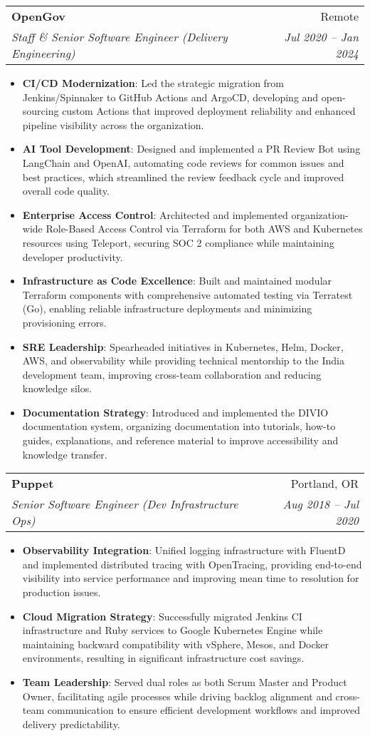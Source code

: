\documentclass[letterpaper,11pt]{article}
\makeatletter
\newcommand{\resumeItem}[2]{
\item[\textsc{}]\small{
    \textbf{#1}{: #2 \vspace{-2pt}}
  }
}
\newcommand{\resumeSubheading}[4]{
  \vspace{-1pt}\item
    \begin{tabular*}{0.97\textwidth}[t]{l@{\extracolsep{\fill}}r}
      \textbf{#1} & #2 \\
      \textit{\small#3} & \textit{\small #4} \\
    \end{tabular*}\vspace{-5pt}
}
\newcommand{\resumeItemListStart}{\begin{itemize}}
\newcommand{\resumeItemListEnd}{\end{itemize}\vspace{-5pt}}
\makeatother
\begin{document}
    \resumeSubheading
      {OpenGov}{Remote}
      {Staff \& Senior Software Engineer (Delivery Engineering)}{Jul 2020 -- Jan 2024}
      \resumeItemListStart
        \resumeItem{CI/CD Modernization}
          {Led the strategic migration from Jenkins/Spinnaker to GitHub Actions and ArgoCD, developing and open-sourcing custom Actions that improved deployment reliability and enhanced pipeline visibility across the organization.}
        \resumeItem{AI Tool Development}
          {Designed and implemented a PR Review Bot using LangChain and OpenAI, automating code reviews for common issues and best practices, which streamlined the review feedback cycle and improved overall code quality.}
        \resumeItem{Enterprise Access Control}
          {Architected and implemented organization-wide Role-Based Access Control via Terraform for both AWS and Kubernetes resources using Teleport, securing SOC 2 compliance while maintaining developer productivity.}
        \resumeItem{Infrastructure as Code Excellence}
          {Built and maintained modular Terraform components with comprehensive automated testing via Terratest (Go), enabling reliable infrastructure deployments and minimizing provisioning errors.}
        \resumeItem{SRE Leadership}
          {Spearheaded initiatives in Kubernetes, Helm, Docker, AWS, and observability while providing technical mentorship to the India development team, improving cross-team collaboration and reducing knowledge silos.}
        \resumeItem{Documentation Strategy}
          {Introduced and implemented the DIVIO documentation system, organizing documentation into tutorials, how-to guides, explanations, and reference material to improve accessibility and knowledge transfer.}
      \resumeItemListEnd

    \resumeSubheading
      {Puppet}{Portland, OR}
      {Senior Software Engineer (Dev Infrastructure Ops)}{Aug 2018 -- Jul 2020}
      \resumeItemListStart
        \resumeItem{Observability Integration}
          {Unified logging infrastructure with FluentD and implemented distributed tracing with OpenTracing, providing end-to-end visibility into service performance and improving mean time to resolution for production issues.}
        \resumeItem{Cloud Migration Strategy}
          {Successfully migrated Jenkins CI infrastructure and Ruby services to Google Kubernetes Engine while maintaining backward compatibility with vSphere, Mesos, and Docker environments, resulting in significant infrastructure cost savings.}
        \resumeItem{Team Leadership}
          {Served dual roles as both Scrum Master and Product Owner, facilitating agile processes while driving backlog alignment and cross-team communication to ensure efficient development workflows and improved delivery predictability.}
      \resumeItemListEnd
\end{document}
